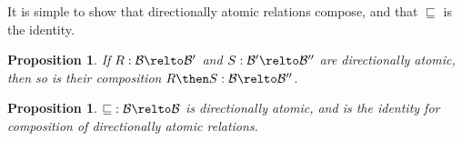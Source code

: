 \documentclass[10pt,a4paper]{article}
\newtheorem{proposition}[theorem]{Proposition}
\begin{document}
It is simple to show that directionally atomic relations compose, and that
$\sqsubseteq$ is the identity.
\begin{proposition}
  If \(R : \mathcal{B} \relto \mathcal{B}'\) and
  \(S : \mathcal{B}' \relto \mathcal{B}''\) are directionally atomic, then so is
  their composition \(R \then S : \mathcal{B} \relto \mathcal{B}''\).
\end{proposition}
%
%

\begin{proposition}
  \(\mathbin{\sqsubseteq} : \mathcal{B} \relto \mathcal{B}\) is directionally
  atomic, and is the identity for composition of directionally atomic relations.
\end{proposition}
\end{document}
